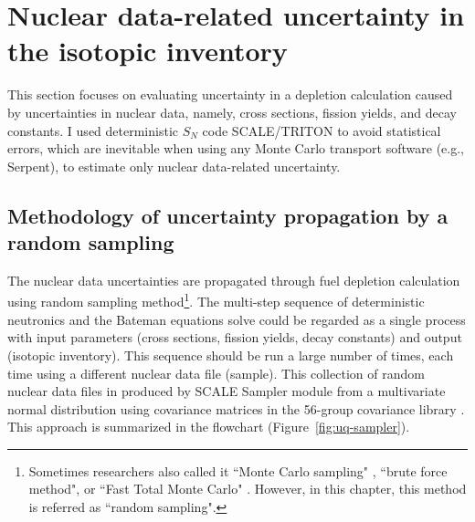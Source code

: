 \section{Nuclear data-related uncertainty in the isotopic inventory}
This section focuses on evaluating uncertainty in a depletion calculation 
caused by uncertainties in nuclear data, namely, cross sections, fission 
yields, and decay constants. I used deterministic $S_N$ code SCALE/TRITON 
\cite{rearden_scale_2018} to avoid statistical errors, which are inevitable 
when using any Monte Carlo transport software (e.g., Serpent), to estimate 
only nuclear data-related uncertainty.

\subsection{Methodology of uncertainty propagation by a random sampling}
The nuclear data uncertainties are propagated through fuel depletion 
calculation using random sampling method\footnote{Sometimes researchers also 
called it ``Monte Carlo sampling" \cite{radaideh_uncertainty_2018}, ``brute 
force method"\cite{garcia-herranz_propagation_2008}, or ``Fast Total Monte 
Carlo" \cite{rochman_nuclear_2014}. However, in this chapter, this method is 
referred as ``random  sampling".}. The multi-step sequence of deterministic 
neutronics and the Bateman equations solve could be regarded as a single 
process with input parameters (cross sections, fission yields, decay 
constants) and output (isotopic inventory). This sequence should be run a 
large number of times, each time using
a different nuclear data file (sample). 
This
collection of random nuclear data files in produced by
SCALE Sampler 
module from a multivariate normal distribution using covariance matrices in 
the 56-group covariance library \cite{rearden_scale_2018, 
radaideh_novel_2019-1}. This approach is summarized in the flowchart 
(Figure~\ref{fig:uq-sampler}).

